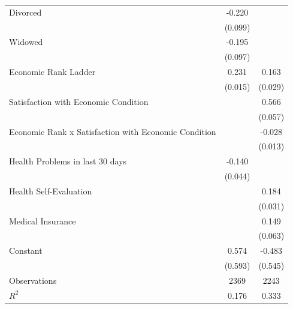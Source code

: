 {\begin{tabular}{l*{2}{c}}
\addlinespace
Divorced            &      -0.220\sym{**} &                     \\
                    &     (0.099)         &                     \\
\addlinespace
Widowed             &      -0.195\sym{**} &                     \\
                    &     (0.097)         &                     \\
\addlinespace
Economic Rank Ladder&       0.231\sym{***}&       0.163\sym{***}\\
                    &     (0.015)         &     (0.029)         \\
\addlinespace
Satisfaction with Economic Condition&                     &       0.566\sym{***}\\
                    &                     &     (0.057)         \\
\addlinespace
Economic Rank x Satisfaction with Economic Condition&                     &      -0.028\sym{**} \\
                    &                     &     (0.013)         \\
\addlinespace
Health Problems in last 30 days&      -0.140\sym{***}&                     \\
                    &     (0.044)         &                     \\
\addlinespace
Health Self-Evaluation&                     &       0.184\sym{***}\\
                    &                     &     (0.031)         \\
\addlinespace
Medical Insurance   &                     &       0.149\sym{**} \\
                    &                     &     (0.063)         \\
\addlinespace
Constant            &       0.574         &      -0.483         \\
                    &     (0.593)         &     (0.545)         \\
\midrule
Observations        &        2369         &        2243         \\
\(R^{2}\)           &       0.176         &       0.333         \\
\bottomrule
\end{tabular}
}
